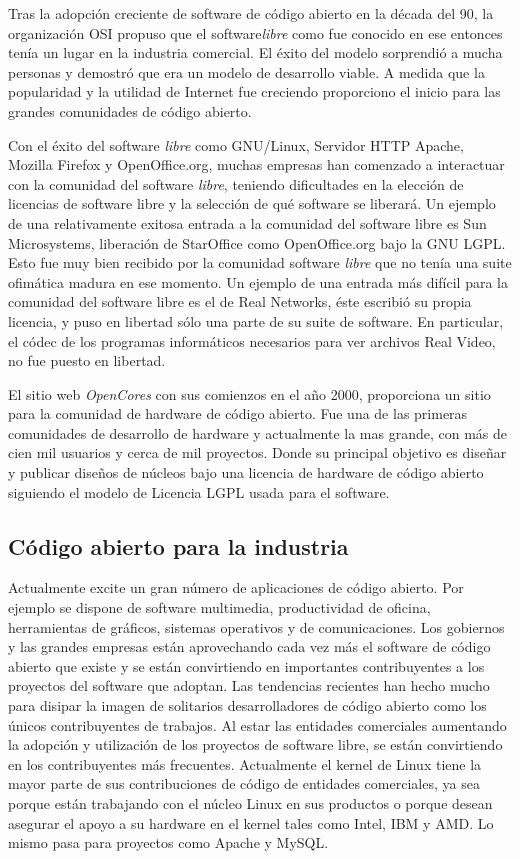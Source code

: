Tras la adopción creciente de software de código abierto en la década
del 90, la organización OSI propuso que el software\textit{libre} como
fue conocido en ese entonces tenía un lugar en la industria
comercial. El éxito del modelo sorprendió a mucha personas y demostró
que era un modelo de desarrollo viable. A medida que la popularidad y
la utilidad de Internet fue creciendo proporciono el inicio para las
grandes comunidades de código abierto.

Con el éxito del software \textit{libre} como GNU/Linux, Servidor HTTP
Apache, Mozilla Firefox y OpenOffice.org, muchas empresas han
comenzado a interactuar con la comunidad del software \textit{libre},
teniendo dificultades en la elección de licencias de software libre y
la selección de qué software se liberará.  Un ejemplo de una
relativamente exitosa entrada a la comunidad del software libre es Sun
Microsystems, liberación de StarOffice como OpenOffice.org bajo la GNU
LGPL. Esto fue muy bien recibido por la comunidad software
\textit{libre} que no tenía una suite ofimática madura en ese
momento. Un ejemplo de una entrada más difícil para la comunidad del
software libre es el de Real Networks, éste escribió su propia
licencia, y puso en libertad sólo una parte de su suite de
software. En particular, el códec de los programas informáticos
necesarios para ver archivos Real Video, no fue puesto en libertad.

El sitio web \textit{OpenCores} con sus comienzos en el año 2000,
proporciona un sitio para la comunidad de hardware de código abierto.
Fue una de las primeras comunidades de desarrollo de hardware y
actualmente la mas grande, con más de cien mil usuarios y cerca de mil
proyectos. Donde su principal objetivo es diseñar y publicar diseños
de núcleos bajo una licencia de hardware de código abierto siguiendo
el modelo de Licencia LGPL usada para el software.

\subsection{Código abierto para la industria}

Actualmente excite un gran número de aplicaciones de código
abierto. Por ejemplo se dispone de software multimedia, productividad
de oficina, herramientas de gráficos, sistemas operativos y de
comunicaciones. Los gobiernos y las grandes empresas están
aprovechando cada vez más el software de código abierto que existe y
se están convirtiendo en importantes contribuyentes a los proyectos
del software que adoptan. Las tendencias recientes han hecho mucho
para disipar la imagen de solitarios desarrolladores de código abierto
como los únicos contribuyentes de trabajos. Al estar las entidades
comerciales aumentando la adopción y utilización de los proyectos de
software libre, se están convirtiendo en los contribuyentes más
frecuentes. Actualmente el kernel de Linux tiene la mayor parte de sus
contribuciones de código de entidades comerciales, ya sea porque están
trabajando con el núcleo Linux en sus productos o porque desean
asegurar el apoyo a su hardware en el kernel tales como Intel, IBM y
AMD. Lo mismo pasa para proyectos como Apache y MySQL.

